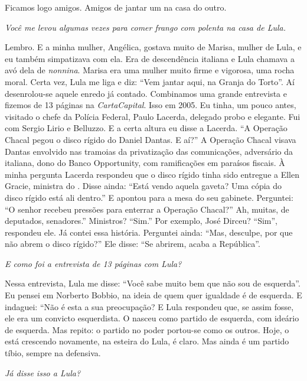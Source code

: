 \normalfont
Ficamos logo amigos. Amigos de jantar um na casa do
outro.

\itshape
 Você me levou algumas vezes para comer frango com
polenta na casa de Lula.

\normalfont
Lembro. E a minha mulher, Angélica, gostava muito de
Marisa, mulher de Lula, e eu também simpatizava com ela. Era de
descendência italiana e Lula chamava a avó dela de \emph{nonnina}.
Marisa era uma mulher muito firme e vigorosa, uma rocha moral. Certa
vez, Lula me liga e diz: ``Vem jantar aqui, na Granja do Torto''. Aí
desenrolou-se aquele enredo já contado. Combinamos uma grande entrevista
e fizemos de 13 páginas na \emph{CartaCapital}. Isso em 2005. Eu tinha,
um pouco antes, visitado o chefe da Polícia Federal, Paulo Lacerda,
delegado probo e elegante. Fui com Sergio Lirio e Belluzzo. E a certa
altura eu disse a Lacerda. ``A Operação Chacal pegou o disco rígido do
Daniel Dantas. E aí?'' A Operação Chacal visava Dantas envolvido nas
tramoias da privatização das comunicações, adversário da  italiana,
dono do Banco Opportunity, com ramificações em paraísos fiscais. À minha
pergunta Lacerda respondeu que o disco rígido tinha sido entregue a
Ellen Gracie, ministra do . Disse ainda: ``Está vendo aquela gaveta?
Uma cópia do disco rígido está ali dentro.'' E apontou para a mesa do
seu gabinete. Perguntei: ``O senhor recebeu pressões para enterrar a
Operação Chacal?'' Ah, muitas, de deputados, senadores.'' Ministros?
``Sim.'' Por exemplo, José Dirceu? ``Sim'', respondeu ele. Já contei
essa história. Perguntei ainda: ``Mas, desculpe, por que não abrem o
disco rígido?'' Ele disse: ``Se abrirem, acaba a República''.

\itshape
 E como foi a entrevista de 13 páginas com Lula?

\normalfont
Nessa entrevista, Lula me disse: ``Você sabe muito bem
que não sou de esquerda''. Eu pensei em Norberto Bobbio, na ideia de
quem quer igualdade é de esquerda. E indaguei: ``Não é esta a sua
preocupação? E Lula respondeu que, se assim fosse, ele era um convicto
esquerdista. O  nasceu como partido de esquerda, com ideário de
esquerda. Mas repito: o partido no poder portou-se como os outros. Hoje,
o  está crescendo novamente, na esteira do Lula, é claro. Mas ainda é
um partido tíbio, sempre na defensiva.

\itshape
 Já disse isso a Lula?

